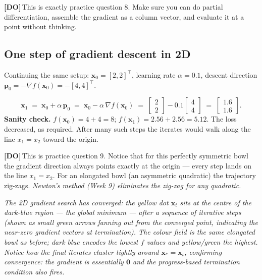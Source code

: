 \documentclass[11pt, a4paper]{article}
\newcommand{\doflag}{\textcolor{defBd}{\textbf{[DO]}}\,}
\begin{document}
\doflag{}This is exactly practice question 8. Make sure you can do partial differentiation, assemble the gradient as a column vector, and evaluate it at a point without thinking.

\subsection{One step of gradient descent in 2D}

Continuing the same setup: $\mathbf{x}_0 = [2,2]^\top$, learning rate $\alpha = 0.1$, descent direction $\mathbf{p}_0 = -\nabla f(\mathbf{x}_0) = -[4,4]^\top$.

\begin{exbox}[{One steepest-descent step on $f(x_1, x_2) = x_1^2 + x_2^2$}]
\[
\mathbf{x}_1 \;=\; \mathbf{x}_0 + \alpha\,\mathbf{p}_0 \;=\; \mathbf{x}_0 - \alpha\,\nabla f(\mathbf{x}_0)
\;=\; \begin{bmatrix} 2 \\ 2 \end{bmatrix} - 0.1 \begin{bmatrix} 4 \\ 4 \end{bmatrix} \;=\; \begin{bmatrix} 1.6 \\ 1.6 \end{bmatrix}.
\]
\textbf{Sanity check.} $f(\mathbf{x}_0) = 4 + 4 = 8$; $f(\mathbf{x}_1) = 2.56 + 2.56 = 5.12$. The loss decreased, as required. After many such steps the iterates would walk along the line $x_1 = x_2$ toward the origin.
\end{exbox}

\doflag{}This is practice question 9. Notice that for this perfectly symmetric bowl the gradient direction always points exactly at the origin — every step lands on the line $x_1 = x_2$. For an elongated bowl (an asymmetric quadratic) the trajectory zig-zags. \emph{Newton's method (Week 9) eliminates the zig-zag for any quadratic.}

\begin{center}

\footnotesize\textit{The 2D gradient search has converged: the yellow dot $\mathbf{x}_t$ sits at the centre of the dark-blue region --- the global minimum --- after a sequence of iterative steps (shown as small green arrows fanning out from the converged point, indicating the near-zero gradient vectors at termination). The colour field is the same elongated bowl as before; dark blue encodes the lowest $f$ values and yellow/green the highest. Notice how the final iterates cluster tightly around $\mathbf{x}_* = \mathbf{x}_t$, confirming convergence: the gradient is essentially $\mathbf{0}$ and the progress-based termination condition also fires.}
\end{center}
\end{document}

